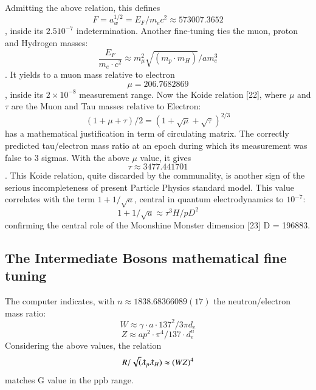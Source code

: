 \documentclass[twoside,draft]{article}
\begin{document}
\begin{sloppypar}
{Admitting the above relation, this defines \begin{equation} 
F = a_{w}^{1/2} = E_{F} /m_{e} c^{2} \approx 573007.3652
\end{equation}, inside its $2.5 10^{-7}$
indetermination. Another fine-tuning ties the muon, proton and Hydrogen masses: 
\begin{equation}
\frac{E_{F}}{m_{e} \cdot c^{2}} \approx
m_{\mu}^{2} \sqrt{(m_{p} \cdot m_{H})}/am_{e}^{3}
\end{equation}. 
It yields to a muon mass relative to electron 
\begin{equation}
\mu = 206.7682869
\end{equation}, inside its
$2 \times 10^{-8}$ measurement range.
Now the Koide relation [22], where $\mu$ and $\tau$ are the Muon and Tau masses relative to Electron:
\begin{equation}
(1 + \mu + \tau)/2 = (1 + \sqrt\mu + \sqrt\tau)^{2/3}
\end{equation}
has a mathematical justification in term of circulating matrix. The correctly predicted tau/electron
mass ratio at an epoch during which its measurement was false to 3 sigmas. With the above $\mu$ value, it
gives $$\tau \approx 3477.441701$$. This Koide relation, quite discarded by the communality, is another sign of
the serious incompleteness of present Particle Physics standard model. This value correlates with the
term $1+1/\sqrt{a}$, central in quantum electrodynamics to $10^{-7}$:
\begin{equation}
1+1/\sqrt{a} \approx \tau^{3} H/pD^{2}
\end{equation}
confirming the central role of the Moonshine Monster dimension [23] D = 196883.

\subsection {The Intermediate Bosons mathematical fine tuning}

The computer indicates, with $n \approx 1838.68366089(17)$ the neutron/electron mass ratio:
\begin{equation}
W \approx \gamma \cdot a \cdot 137^{2} / 3\pi d_{e}
\end{equation}
\begin{equation}
Z \approx ap^{2} \cdot \pi^{4} / 137 \cdot d_{e}^{n}
\end{equation}
Considering the above values, the relation $$R/\sqrt(\lambdabar_{p} \lambdabar_{H} ) \approx (WZ)^{4}$$ matches G value in the ppb range.

}
\end{sloppypar}
\end{document}
